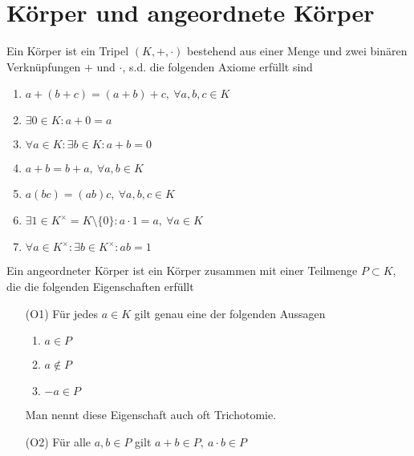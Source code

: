     \section{Körper und angeordnete Körper}
    \begin{defn} Ein Körper ist ein Tripel $(K,+,\cdot)$ bestehend aus einer Menge und zwei binären Verknüpfungen $+$ und $\cdot$, s.d. die folgenden Axiome erfüllt sind
        \begin{enumerate}[(1)]
            \item $a+(b+c)= (a+b)+c, \ \forall a,b,c\in K$
            \item $\exists 0\in K : a+0 = a$
            \item $\forall a\in K : \exists b\in K : a+b=0$
            \item $a+b=b+a, \ \forall a,b\in K$
            \item $a(bc) = (ab)c, \ \forall a,b,c\in K$
            \item $\exists 1\in K^\times  = K \setminus\{0\}: a\cdot 1 = a, \ \forall a\in K$
            \item $\forall a\in K^\times:\exists b\in K^\times : ab=1$
        \end{enumerate} 
    \end{defn}
    \begin{defn}
        Ein angeordneter Körper ist ein Körper zusammen mit einer Teilmenge $P\subset K$, die die folgenden Eigenschaften erfüllt
        \begin{enumerate}
            \item[(O1)] Für jedes $a\in K$ gilt genau eine der folgenden Aussagen \begin{enumerate}[(1)]
                \item $a\in P$
                \item $a\notin P$
                \item $-a\in P$
            \end{enumerate}   
            Man nennt diese Eigenschaft auch oft Trichotomie.
            \item[(O2)] Für alle $a,b\in P$ gilt $a+b\in P, \ a\cdot b\in P$
        \end{enumerate}
    \end{defn}

